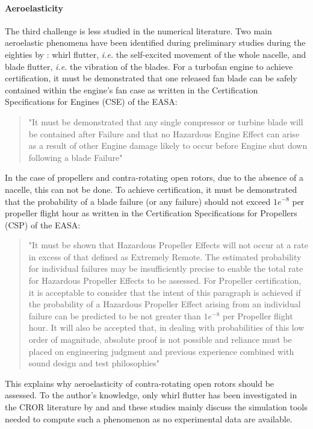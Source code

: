 \paragraph{Aeroelasticity}
The third challenge is less studied in the numerical literature.
Two main aeroelastic phenomena have been identified during preliminary studies
during the eighties by \citet{Hager1988}: whirl flutter, \emph{i.e.} the self-excited
movement of the whole nacelle, and blade flutter, \emph{i.e.} the vibration
of the blades.
For a turbofan engine to achieve certification, it must be 
demonstrated that one released fan blade can be safely contained 
within the engine’s fan case as written in the 
Certification Specifications for Engines (CSE) of the EASA:
\begin{quote}
	"It must be demonstrated that any single compressor or turbine blade will be contained after Failure and 
that no Hazardous Engine Effect can arise as a result of other Engine damage likely to occur before 
Engine shut down following a blade Failure"
\end{quote}
In the case of propellers and contra-rotating open rotors, due to the absence of a nacelle,
this can not be done. To achieve certification, it must be demonstrated that the probability of a blade
failure (or any failure) should not exceed $1e^{-8}$ per propeller flight hour as written in 
the Certification Specifications for Propellers (CSP) of the EASA:
\begin{quote}
	"It must be shown that Hazardous Propeller Effects will not occur at a rate in excess of that defined 
as Extremely Remote. The estimated probability for individual failures may be insufficiently precise 
to enable the total rate for Hazardous Propeller Effects to be assessed. For Propeller certification, it 
is acceptable to consider that the intent of this paragraph is achieved if the probability of a 
Hazardous Propeller Effect arising from an individual failure can be predicted to be not greater than 
$1e^{-8}$ per Propeller flight hour. It will also be accepted that, in dealing with probabilities of this low 
order of magnitude, absolute proof is not possible and reliance must be placed on engineering 
judgment and previous experience combined with sound design and test philosophies" 
\end{quote}
This explains why aeroelasticity of contra-rotating open rotors should be assessed.
To the author's knowledge, only whirl flutter has been investigated
in the CROR literature by \citet{CISicot2011a} and 
\citet{Verley2013} and these studies mainly
discuss the simulation tools needed to compute such a phenomenon as
no experimental data are available.
